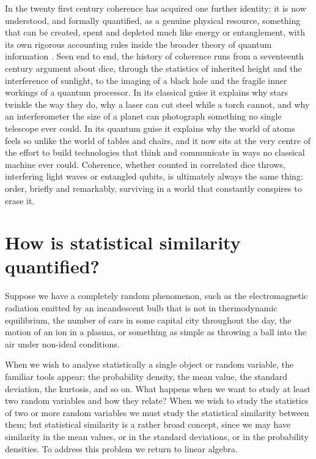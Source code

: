 	In the twenty first century coherence has acquired one further identity: it is now
	understood, and formally quantified, as a genuine physical resource, something that can
	be created, spent and depleted much like energy or entanglement, with its own rigorous
	accounting rules inside the broader theory of quantum information
	\cite{baumgratz2014quantifying}. Seen end to end, the history of coherence runs from a
	seventeenth century argument about dice, through the statistics of inherited height and
	the interference of sunlight, to the imaging of a black hole and the fragile inner
	workings of a quantum processor. In its classical guise it explains why stars twinkle
	the way they do, why a laser can cut steel while a torch cannot, and why an interferometer
	the size of a planet can photograph something no single telescope ever could. In its
	quantum guise it explains why the world of atoms feels so unlike the world of tables and
	chairs, and it now sits at the very centre of the effort to build technologies that think
	and communicate in ways no classical machine ever could. Coherence, whether counted in
	correlated dice throws, interfering light waves or entangled qubits, is ultimately always
	the same thing: order, briefly and remarkably, surviving in a world that constantly
	conspires to erase it.

\section{How is statistical similarity quantified?}

	Suppose we have a completely random phenomenon, such as the electromagnetic radiation
	emitted by an incandescent bulb that is not in thermodynamic equilibrium, the number of
	cars in some capital city throughout the day, the motion of an ion in a plasma, or
	something as simple as throwing a ball into the air under non-ideal conditions.

	When we wish to analyse statistically a single object or random variable, the familiar
	tools appear: the probability density, the mean value, the standard deviation, the
	kurtosis, and so on. What happens when we want to study at least two random variables and
	how they relate? When we wish to study the statistics of two or more random variables we
	must study the statistical similarity between them; but statistical similarity is a rather
	broad concept, since we may have similarity in the mean values, or in the standard
	deviations, or in the probability densities. To address this problem we return to linear
	algebra.

